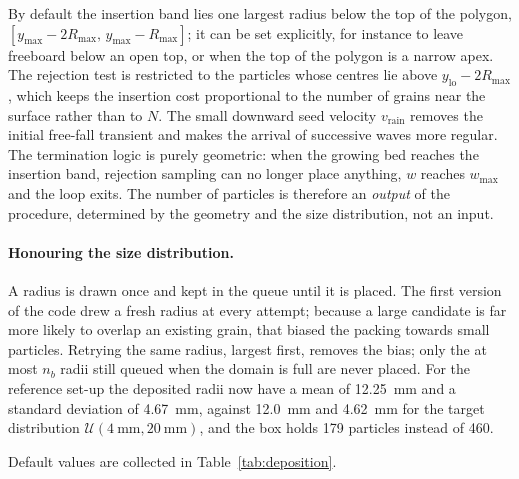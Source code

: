 By default the insertion band lies one largest radius below the top of the
polygon, $[y_{\max}-2R_{\max},\,y_{\max}-R_{\max}]$; it can be set explicitly,
for instance to leave freeboard below an open top, or when the top of the
polygon is a narrow apex.  The rejection test is restricted to the particles
whose centres lie above $y_{\text{lo}}-2R_{\max}$, which keeps the insertion
cost proportional to the number of grains near the surface rather than to $N$.
The small downward seed velocity $v_{\text{rain}}$ removes the initial free-fall
transient and makes the arrival of successive waves more regular.  The
termination logic is purely geometric: when the growing bed reaches the
insertion band, rejection sampling can no longer place anything, $w$ reaches
$w_{\max}$ and the loop exits.  The number of particles is therefore an
\emph{output} of the procedure, determined by the geometry and the size
distribution, not an input.

\paragraph{Honouring the size distribution.}  A radius is drawn once and kept in
the queue until it is placed.  The first version of the code drew a fresh radius
at every attempt; because a large candidate is far more likely to overlap an
existing grain, that biased the packing towards small particles.  Retrying the
same radius, largest first, removes the bias; only the at most $n_{b}$ radii
still queued when the domain is full are never placed.  For the reference
set-up the deposited radii now have a mean of \qty{12.25}{\milli\metre} and a
standard deviation of \qty{4.67}{\milli\metre}, against
\qty{12.0}{\milli\metre} and \qty{4.62}{\milli\metre} for the target
distribution $\mathcal{U}(\qty{4}{\milli\metre},\qty{20}{\milli\metre})$, and
the box holds \num{179} particles instead of \num{460}.

Default values are collected in Table~\ref{tab:deposition}.

